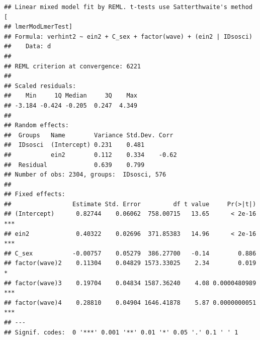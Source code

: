 \documentclass[
]{book}
\newenvironment{Shaded}{\begin{snugshade}}{\end{snugshade}}
\newcommand{\CommentTok}[1]{\textcolor[rgb]{0.56,0.35,0.01}{\textit{#1}}}
\newcommand{\DataTypeTok}[1]{\textcolor[rgb]{0.13,0.29,0.53}{#1}}
\newcommand{\KeywordTok}[1]{\textcolor[rgb]{0.13,0.29,0.53}{\textbf{#1}}}
\newcommand{\NormalTok}[1]{#1}
\newcommand{\OperatorTok}[1]{\textcolor[rgb]{0.81,0.36,0.00}{\textbf{#1}}}
\newcommand{\OtherTok}[1]{\textcolor[rgb]{0.56,0.35,0.01}{#1}}
\newcommand{\StringTok}[1]{\textcolor[rgb]{0.31,0.60,0.02}{#1}}
\begin{document}
\begin{verbatim}
## Linear mixed model fit by REML. t-tests use Satterthwaite's method [
## lmerModLmerTest]
## Formula: verhint2 ~ ein2 + C_sex + factor(wave) + (ein2 | IDsosci)
##    Data: d
## 
## REML criterion at convergence: 6221
## 
## Scaled residuals: 
##    Min     1Q Median     3Q    Max 
## -3.184 -0.424 -0.205  0.247  4.349 
## 
## Random effects:
##  Groups   Name        Variance Std.Dev. Corr 
##  IDsosci  (Intercept) 0.231    0.481         
##           ein2        0.112    0.334    -0.62
##  Residual             0.639    0.799         
## Number of obs: 2304, groups:  IDsosci, 576
## 
## Fixed effects:
##                 Estimate Std. Error         df t value     Pr(>|t|)    
## (Intercept)      0.82744    0.06062  758.00715   13.65      < 2e-16 ***
## ein2             0.40322    0.02696  371.85383   14.96      < 2e-16 ***
## C_sex           -0.00757    0.05279  386.27700   -0.14        0.886    
## factor(wave)2    0.11304    0.04829 1573.33025    2.34        0.019 *  
## factor(wave)3    0.19704    0.04834 1587.36240    4.08 0.0000480989 ***
## factor(wave)4    0.28810    0.04904 1646.41878    5.87 0.0000000051 ***
## ---
## Signif. codes:  0 '***' 0.001 '**' 0.01 '*' 0.05 '.' 0.1 ' ' 1
\end{verbatim}

\begin{Shaded}
\end{Shaded}
\end{document}
